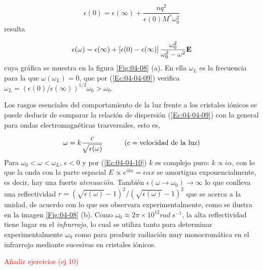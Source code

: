 \begin{equation}
	\epsilon(0) = \epsilon(\infty)  + \frac{nq^2}{\epsilon(0) M^*\omega_0^2}
\end{equation}
resulta 

\begin{equation}
	\epsilon (\omega) = \epsilon(\infty) + \left[ \epsilon(0)-\epsilon(\infty) \right] \frac{\omega_0^2}{\omega_0^2 - \omega^2} \mathbf{E}\label{Ec:04-04-09}
\end{equation}
cuya gráfica se muestra en la figura \ref{Fig:04-08} (a). En ella $\omega_L$ es la frecuencia para la que $\omega(\omega_L)=0$, que por  (\ref{Ec:04-04-09}) verifica $\omega_L = (\epsilon(0)/\epsilon(\infty))^{1/2} \omega_0 >\omega_0$.


Los rasgos esenciales del comportamiento de la luz frente a los cristales iónicos se puede deducir de comparar la relación de dispersión (\ref{Ec:04-04-09}) con la general para ondas electromagnéticas trasversales, esto es,

\begin{equation}
	\omega = k \frac{c}{\sqrt{\epsilon(\omega)}} \quad \quad \quad (c = \text{velocidad de la luz})	\label{Ec:04-04-10}
\end{equation}
Para $\omega_0 < \omega < \omega_L$, $\epsilon <0$ y por (\ref{Ec:04-04-10}) $k$ es complejo puro: $k \propto i \alpha$, con lo que la onda con la parte espacial $E \propto e^{ika} = \epsilon{\alpha x}$ se amortigua exponencialmente, es decir, hay una fuerte \textit{atenuación}. También $\epsilon (\omega \rightarrow \omega_0) \rightarrow \infty$ lo que conlleva una reflectividad $r= (\sqrt{\epsilon(\omega)}-1)^2 / (\sqrt{\epsilon(\omega)}-1)^2$ que se acerca a la unidad, de acuerdo con lo que ses observara experimentalmente, como se ilustra en la imagen \ref{Fig:04-08} (b). Como $\omega_0\approx 2 \pi \times 10^{12} \unit{rad \ s^{-1}}$, la alta reflectividad tiene lugar en el \textit{infrarrojo}, lo cual se utiliza tanto para determinar experimentalmente $\omega_0$ como para producir radiación muy monocromática en el infrarrojo mediante sucesivas en cristales iónicos.

\begin{Anotacion}
	\textcolor{red}{Añadir ejercicios (ej 10)}
\end{Anotacion}
